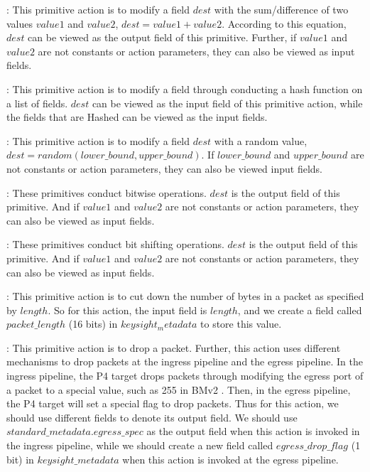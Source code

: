 : This primitive action is to modify a field $dest$ with the sum/difference of two values $value1$ and $value2$, \ie{} $dest = value1 + value2$. According to this equation, $dest$ can be viewed as the output field of this primitive. Further, if $value1$ and $value2$ are not constants or action parameters, they can also be viewed as input fields.

: This primitive action is to modify a field through conducting a hash function on a list of fields. $dest$ can be viewed as the input field of this primitive action, while the fields that are Hashed can be viewed as the input fields.

: This primitive action is to modify a field $dest$ with a random value, \ie{} $dest = random(lower\_bound, upper\_bound)$. If $lower\_bound$ and $upper\_bound$ are not constants or action parameters, they can also be viewed input fields.

: These primitives conduct bitwise operations. $dest$ is the output field of this primitive. And if $value1$ and $value2$ are not constants or action parameters, they can also be viewed as input fields.

: These primitives conduct bit shifting operations. $dest$ is the output field of this primitive. And if $value1$ and $value2$ are not constants or action parameters, they can also be viewed as input fields.


: This primitive action is to cut down the number of bytes in a packet as specified by $length$. So for this action, the input field is $length$, and we create a field called $packet\_length$ (16 bits) in $keysight_metadata$ to store this value.

: This primitive action is to drop a packet. Further, this action uses different mechanisms to drop packets at the ingress pipeline and the egress pipeline. In the ingress pipeline, the P4 target drops packets through modifying the egress port of a packet to a special value, such as 255 in BMv2 \cite{bmv2-P4}. Then, in the egress pipeline, the P4 target will set a special flag to drop packets. Thus for this action, we should use different fields to denote its output field. We should use $standard\_metadata.egress\_spec$ as the output field when this action is invoked in the ingress pipeline, while we should create a new field called $egress\_drop\_flag$ (1 bit) in $keysight\_metadata$  when this action is invoked at the egress pipeline.

